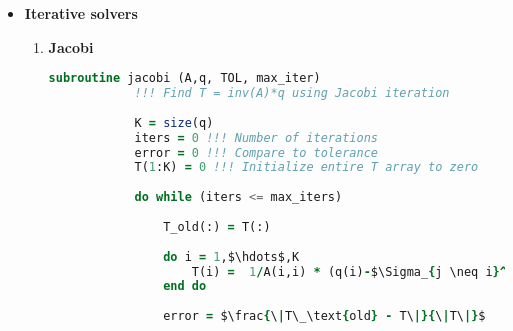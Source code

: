 \documentclass[12 pt, final]{article}
\renewcommand{\d}{\times}
\begin{document}
\begin{itemize}
\begin{itemize}
\begin{enumerate}
\begin{align*}
\begin{smallmatrix}
                &&&&&&&&&&&&&&&&&&&&&&&&&&&& \d\\
                &&&&&&&&&&&&&&&&&&&&&&&&&&&&& \d\\
                &&&&&&&&&&&&&&&&\d&&&&&&&\d&&&&&\d&\d&\d&\d&\d&&&&&\d&&&&&&&\d \\
                &&&&&&&&&&&&&&&&&\d&&&&&&&\d&&&&&\d&\d&\d&\d&\d&&&&&\d&&&&&&&\d \\
                &&&&&&&&&&&&&&&&&&\d&&&&&&&\d&&&&&\d&\d&\d&\d&\d&&&&&\d&&&&&&&\d \\
                &&&&&&&&&&&&&&&&&&&&&&&&&&&&&&&&&\d\\
                &&&&&&&&&&&&&&&&&&&&&&&&&&&&&&&&&&\d\\    
                &&&&&&&&&&&&&&&&&&&&&&&&&&&&&&&&&&&\ddots\\
                \end{smallmatrix}\right]
            \end{align*} 
            \texttt{Number of non-zero elements on an interior row of the matrix = \textcolor{red}{9}}.\\ 
             Now (\ref{eq5}) can be written as,
                \begin{align*}
                    \mathbf{AT} = \mathbf{q}
                \end{align*}
            \end{enumerate}
        \end{itemize}
    \item \textbf{Iterative solvers}
        \begin{enumerate}
            \item \textbf{Jacobi}
            \begin{lstlisting}[language=fortran,mathescape=true]
            subroutine jacobi (A,q, TOL, max_iter)
            !!! Find T = inv(A)*q using Jacobi iteration
            
            K = size(q)
            iters = 0 !!! Number of iterations
            error = 0 !!! Compare to tolerance
            T(1:K) = 0 !!! Initialize entire T array to zero
            
            do while (iters <= max_iters)
            
                T_old(:) = T(:)
                
                do i = 1,$\hdots$,K
                    T(i) =  1/A(i,i) * (q(i)-$\Sigma_{j \neq i}^{K}$A(i,j)T_old(j))
                end do
                
                error = $\frac{\|T\_\text{old} - T\|}{\|T\|}$
                

\end{lstlisting}
\end{enumerate}
\end{itemize}
\end{document}
